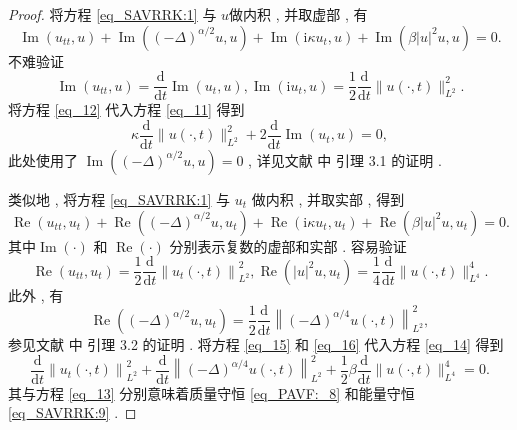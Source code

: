 \begin{proof}
	将方程 \eqref{eq_SAVRRK:1} 与 $u$做内积 , 并取虚部 , 有
\begin{equation}
\operatorname{Im}\left(u_{t t} , u\right)+\operatorname{Im}\left((-\Delta)^{\alpha / 2} u , u\right)+\operatorname{Im}\left(\mathrm{i} \kappa u_{t} , u\right)+\operatorname{Im}\left(\beta|u|^{2} u , u\right)=0  . 
\label{eq_11}\end{equation}
不难验证
\begin{equation}
\operatorname{Im}\left(u_{t t} , u\right)=\frac{\mathrm{d}}{\mathrm{d} t} \operatorname{Im}\left(u_{t} , u\right) , \operatorname{Im}\left(\mathrm{i} u_{t} , u\right)=\frac{1}{2} \frac{\mathrm{d}}{\mathrm{d} t}\|u(\cdot , t)\|_{L^{2}}^{2}  . 
\label{eq_12}\end{equation}
将方程 \eqref{eq_12} 代入方程 \eqref{eq_11} 得到
\begin{equation}
\kappa \frac{\mathrm{d}}{\mathrm{d} t}\|u(\cdot , t)\|_{L^{2}}^{2}+2 \frac{\mathrm{d}}{\mathrm{d} t} \operatorname{Im}\left(u_{t} , u\right)=0 , 
\label{eq_13}\end{equation}
此处使用了 $\operatorname{Im}\left((-\Delta)^{\alpha / 2} u , u\right)=0$ , 
详见文献 \citep{guoExistenceGlobalSmooth2008}中 引理 3.1 的证明 . 

类似地 , 将方程 \eqref{eq_SAVRRK:1} 与 $u_{t}$ 做内积 , 并取实部 , 得到
\begin{equation}
\operatorname{Re}\left(u_{t t} , u_{t}\right)+\operatorname{Re}\left((-\Delta)^{\alpha / 2} u , u_{t}\right)+\operatorname{Re}\left(\mathrm{i} \kappa u_{t} , u_{t}\right)+\operatorname{Re}\left(\beta|u|^{2} u , u_{t}\right)=0  . 
\label{eq_14}\end{equation}
其中$\operatorname{Im}(\cdot)$ 和 $\operatorname{Re}(\cdot)$ 分别表示复数的虚部和实部 . 容易验证
\begin{equation}
\operatorname{Re}\left(u_{t t} , u_{t}\right)=\frac{1}{2} \frac{\mathrm{d}}{\mathrm{d} t}\left\|u_{t}(\cdot , t)\right\|_{L^{2}}^{2} , \operatorname{Re}\left(|u|^{2} u , u_{t}\right)=\frac{1}{4} \frac{\mathrm{d}}{\mathrm{d} t}\|u(\cdot , t)\|_{L^{4}}^{4}  . 
\label{eq_15}\end{equation}
此外 , 有
\begin{equation}
\operatorname{Re}\left((-\Delta)^{\alpha / 2} u , u_{t}\right)=\frac{1}{2} \frac{\mathrm{d}}{\mathrm{d} t}\left\|(-\Delta)^{\alpha / 4} u(\cdot , t)\right\|_{L^{2}}^{2} , 
\label{eq_16}\end{equation}
参见文献 \citep{guoExistenceGlobalSmooth2008}中 引理 3.2 的证明 . 
将方程 \eqref{eq_15} 和 \eqref{eq_16} 代入方程 \eqref{eq_14} 得到
\begin{equation}
\frac{\mathrm{d}}{\mathrm{d} t}\left\|u_{t}(\cdot , t)\right\|_{L^{2}}^{2}+\frac{\mathrm{d}}{\mathrm{d} t}\left\|(-\Delta)^{\alpha / 4} u(\cdot , t)\right\|_{L^{2}}^{2}+\frac{1}{2} \beta \frac{\mathrm{d}}{\mathrm{d} t}\|u(\cdot , t)\|_{L^{4}}^{4}=0  . 
\label{eq_17}\end{equation}
其与方程 \eqref{eq_13} 分别意味着质量守恒 \eqref{eq_PAVF:_8} 和能量守恒 \eqref{eq_SAVRRK:9} . 

\end{proof}

